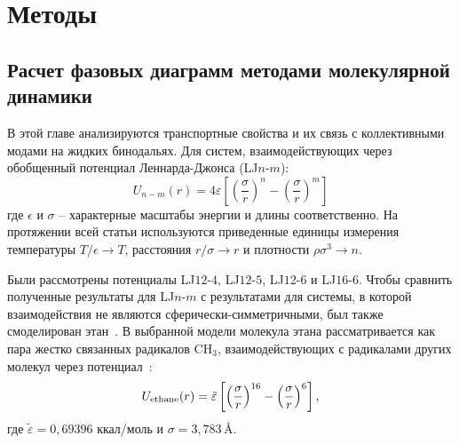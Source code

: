 \section{Методы}
\label{MACR-SecMethods}

\subsection{Расчет фазовых диаграмм методами молекулярной динамики}
\label{MACR-SubSecMD}

В этой главе анализируются транспортные свойства и их связь с коллективными модами на жидких бинодальях.
Для систем, взаимодействующих через обобщенный потенциал Леннарда-Джонса (LJ$n$-$m$):
\begin{equation}
  U_{n-m}(r)=4 \varepsilon\left[\left(\frac{\sigma}{r}\right)^{n}-\left(\frac{\sigma}{r}\right)^{m}\right]
  \label{MACR-eq1}
\end{equation}
где $\epsilon$ и $\sigma$ -- характерные масштабы энергии и длины соответственно.
На протяжении всей статьи используются приведенные единицы измерения температуры $ T/ \epsilon \rightarrow T $, расстояния $ r/ \sigma \rightarrow r $ и плотности $ \rho \sigma ^ 3 \rightarrow n$.


Были рассмотрены потенциалы LJ$12$-$4$, LJ$12$-$5$, LJ$12$-$6$ и LJ$16$-$6$.
Чтобы сравнить полученные результаты для LJ$n$-$m$ с результатами для системы, в которой взаимодействия не являются сферически-симметричными, был также смоделирован этан~\cite{10.1021/acs.jced.6b01036}.
В выбранной модели молекула этана рассматривается как пара жестко связанных радикалов CH$_3$, взаимодействующих с радикалами других молекул через потенциал~\cite{10.1021/acs.jced.6b01036}:
\begin{equation}
  U_{\rm {ethane}}(r) = \tilde \varepsilon\left[\left(\frac{\sigma}{r}\right)^{16}-\left(\frac{\sigma}{r}\right)^{6}\right],
  \label{MACR-eq2}
\end{equation}
где $\tilde\varepsilon = 0{,}69396$ ккал/моль и $\sigma = 3{,}783$\,\AA.

